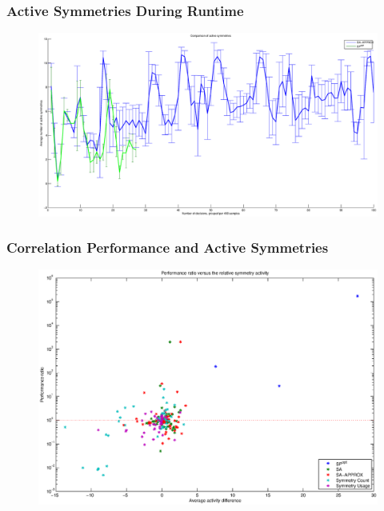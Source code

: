\documentclass{beamer}
\begin{document}
	\begin{frame}[plain]
		\frametitle{Active Symmetries During Runtime}
		\begin{figure}
			\centerline{\includegraphics[width=1.4\textwidth]{../results/battleship-12-23-approx-vs-reg.eps}}
			\label{fig:active_symmetries_during_search}
		\end{figure}
	\end{frame}
	
	\begin{frame}[plain]
		\frametitle{Correlation Performance and Active Symmetries}
		\begin{figure}
			\center
			\centerline{\includegraphics[width=1.3\textwidth]{../results/scatterplot_activity.eps}}
			\label{fig:correlation}
		\end{figure}
	\end{frame}
	
\end{document}
